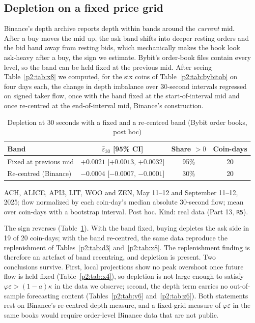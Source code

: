 \subsection{Depletion on a fixed price grid}\label{p2:sec:fixedgrid}
Binance's depth archive reports depth within bands around the \emph{current} mid. After a buy moves the mid up, the ask band shifts into deeper resting orders and the bid band away from resting bids, which mechanically makes the book look ask-heavy after a buy, the sign we estimate. Bybit's order-book files contain every level, so the band can be held fixed at the previous mid. After seeing Table~\ref{p2:tab:x8} we computed, for the six coins of Table~\ref{p2:tab:bybitob} on four days each, the change in depth imbalance over 30-second intervals regressed on signed taker flow, once with the band fixed at the start-of-interval mid and once re-centred at the end-of-interval mid, Binance's construction.

\begin{table}[t]\centering\small
\begin{threeparttable}
\caption{Depletion at 30 seconds with a fixed and a re-centred band (Bybit order books, post hoc)}\label{p2:tab:fixedgrid}
\begin{tabular}{lccc}
\toprule
Band & $\hat\varepsilon_{30}$ [95\% CI] & Share $>0$ & Coin-days\\
\midrule
Fixed at previous mid & $+0.0021$ [$+0.0013$, $+0.0032$] & 95\% & 20\\
Re-centred (Binance) & $-0.0004$ [$-0.0007$, $-0.0001$] & 30\% & 20\\
\bottomrule
\end{tabular}
\begin{tablenotes}\footnotesize\item ACH, ALICE, API3, LIT, WOO and ZEN, May 11--12 and September 11--12, 2025; flow normalized by each coin-day's median absolute 30-second flow; mean over coin-days with a bootstrap interval. Post hoc. Kind: real data (Part 13, \texttt{R5}).\end{tablenotes}
\end{threeparttable}
\end{table}

The sign reverses (Table~\ref{p2:tab:fixedgrid}). With the band fixed, buying depletes the ask side in 19 of 20 coin-days; with the band re-centred, the same data reproduce the replenishment of Tables~\ref{p2:tab:d3} and~\ref{p2:tab:x8}. The replenishment finding is therefore an artefact of band recentring, and depletion is present. Two conclusions survive. First, local projections show no peak overshoot once future flow is held fixed (Table~\ref{p2:tab:x4}), so depletion is not large enough to satisfy $\varphi\varepsilon>(1-a)\kappa$ in the data we observe; second, the depth term carries no out-of-sample forecasting content (Tables~\ref{p2:tab:y6} and~\ref{p2:tab:z6}). Both statements rest on Binance's re-centred depth measure, and a fixed-grid measure of $\varphi\varepsilon$ in the same books would require order-level Binance data that are not public.

